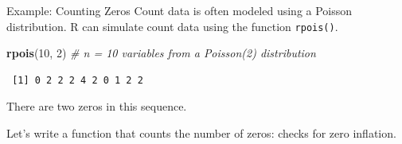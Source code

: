 \documentclass[
  ignorenonframetext,
  aspectratio=1610,
  onlytextwidth]{beamer}
\newenvironment{Shaded}{\begin{snugshade}}{\end{snugshade}}
\newcommand{\CommentTok}[1]{\textcolor[rgb]{0.56,0.35,0.01}{\textit{#1}}}
\newcommand{\DecValTok}[1]{\textcolor[rgb]{0.00,0.00,0.81}{#1}}
\newcommand{\FunctionTok}[1]{\textcolor[rgb]{0.13,0.29,0.53}{\textbf{#1}}}
\newcommand{\NormalTok}[1]{#1}
\begin{document}
\begin{frame}[fragile]{Example: Counting Zeros}
\label{example-counting-zeros}
Count data is often modeled using a Poisson distribution. R can simulate
count data using the function \texttt{rpois()}.

\begin{Shaded}
\begin{Highlighting}[]
\FunctionTok{rpois}\NormalTok{(}\DecValTok{10}\NormalTok{, }\DecValTok{2}\NormalTok{) }\CommentTok{\# n = 10 variables from a Poisson(2) distribution}
\end{Highlighting}
\end{Shaded}

\begin{verbatim}
 [1] 0 2 2 2 4 2 0 1 2 2
\end{verbatim}

\pause

There are two zeros in this sequence.

\pause

Let's write a function that counts the number of zeros: checks for zero
inflation.
\end{frame}
\end{document}
